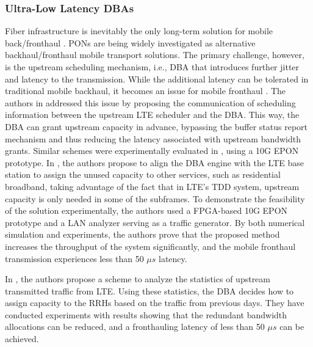 \subsubsection{Ultra-Low Latency \acp{DBA}}

Fiber infrastructure is inevitably the only long-term solution for mobile back/fronthaul \cite{6461186}. \acp{PON} are being widely investigated as alternative backhaul/fronthaul mobile transport solutions. The primary challenge, however, is the upstream scheduling mechanism, i.e., \ac{DBA} that introduces further jitter and latency to the transmission. While the additional latency can be tolerated in traditional mobile backhaul, it becomes an issue for mobile fronthaul \cite{6886953}.
The authors in \cite{6886953} addressed this issue by proposing the communication of scheduling information between the upstream \ac{LTE} scheduler and the \ac{DBA}. This way, the \ac{DBA} can grant upstream capacity in advance, bypassing the buffer status report mechanism and thus reducing the latency associated with upstream bandwidth grants. Similar schemes were experimentally evaluated in \cite{7936876}, using a 10G \ac{EPON} prototype.
In \cite{Hisano2016icc, Hisano2016ecoc}, the authors propose to align the \ac{DBA} engine with the \ac{LTE} base station to assign the unused capacity to other services, such as residential broadband, taking advantage of the fact that in \ac{LTE}'s \ac{TDD} system, upstream capacity is only needed in some of the subframes. To demonstrate the feasibility of the solution experimentally, the authors used a \ac{FPGA}-based 10G \ac{EPON} prototype and a \ac{LAN} analyzer serving as a traffic generator. By both numerical simulation and experiments, the authors prove that the proposed method increases the throughput of the system significantly, and the mobile fronthaul transmission experiences less than 50 $\mu s$ latency.

In \cite{Kobayashi2016}, the authors propose a scheme to analyze the statistics of upstream transmitted traffic from \ac{LTE}. Using these statistics, the \ac{DBA} decides how to assign capacity to the \acp{RRH} based on the traffic from previous days. They have conducted experiments with results showing that the redundant bandwidth allocations can be reduced, and a fronthauling latency of less than 50 $\mu s$ can be achieved.
